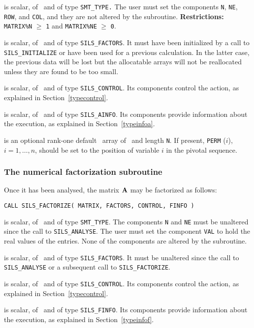 \documentclass{galahad}
\newcommand{\packagename}{SILS}
\begin{document}
\begin{description}
 is scalar, of \intentin\ and of type 
{\tt SMT\_TYPE.}  
The user must set the components {\tt N}, {\tt NE}, {\tt ROW}, 
and {\tt COL}, and they are not altered by the subroutine. 
 {\bf Restrictions:} 
 {\tt MATRIX\%N} $\geq$ {\tt 1} and {\tt MATRIX\%NE} $\geq$ {\tt 0}. 
  
 is scalar, of \intentinout\ and of type 
{\tt \packagename\_FACTORS}. It must have been initialized by a call to 
{\tt \packagename\_INI\-TIALIZE} or have been used for a previous calculation. 
In the latter case, the previous data will be lost but the allocatable 
arrays will not be reallocated unless they are found to be too small. 
 
 is scalar, of \intentin\ and of type 
{\tt \packagename\_CONTROL}. Its components control the action, as explained in 
Section~\ref{typecontrol}. 
 
 is scalar, of \intentout\ and of type {\tt \packagename\_AINFO}. 
Its components provide information about the execution, as explained in 
Section~\ref{typeinfoa}. 
 
 is an optional rank-one default \integer\ array of \intentin\
and length {\tt N}.
If present, {\tt PERM} ($i$), $i = 1, \ldots, n$, should be set 
to the position of  variable $i$ in the pivotal sequence. 
  
\end{description}


\subsubsection{The numerical factorization subroutine}
Once it has been analysed, the matrix ${\mathbf{A}}$ may be factorized as follows:

\hskip0.5in 
{\tt CALL \packagename\_FACTORIZE( MATRIX, FACTORS, CONTROL, FINFO )}

\begin{description}

 is scalar, of \intentin\ and of type {\tt SMT\_TYPE}.  The 
components {\tt N} and {\tt NE} must be unaltered since the call 
to {\tt \packagename\_ANALYSE}. The user must set the component {\tt VAL} 
to hold the real values of the entries. None of the components are altered 
by the subroutine. 
 
 is scalar, of \intentinout\ and of type 
{\tt \packagename\_FACTORS}. It must be unaltered since the call 
to {\tt \packagename\_ANALYSE} or a subsequent call to 
{\tt \packagename\_FACTORIZE}. 
 
 is scalar, of \intentin\ and of type 
{\tt \packagename\_CONTROL}. Its components control the action, as explained in 
Section~\ref{typecontrol}. 
 
 is scalar, of \intentout\ and of type {\tt \packagename\_FINFO}. 
Its components provide information about the execution, as explained in 
Section~\ref{typeinfof}. 

\end{description}
\end{document}
